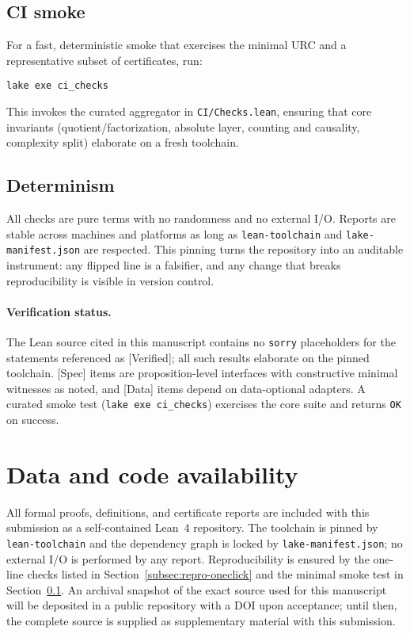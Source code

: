 \documentclass[11pt,a4paper,twoside]{article}
\numberwithin{equation}{section}
\theoremstyle{customthm}
\theoremstyle{customdef}
\theoremstyle{customrem}
\begin{document}
\subsection{CI smoke}\label{subsec:repro-ci}

For a fast, deterministic smoke that exercises the minimal URC and a representative subset of certificates, run:
\begin{lstlisting}
lake exe ci_checks
\end{lstlisting}
This invokes the curated aggregator in \texttt{CI/Checks.lean}, ensuring that core invariants (quotient/factorization, absolute layer, counting and causality, complexity split) elaborate on a fresh toolchain.

\subsection{Determinism}\label{subsec:repro-determinism}

All checks are pure terms with no randomness and no external I/O. Reports are stable across machines and platforms as long as \texttt{lean-toolchain} and \texttt{lake-manifest.json} are respected. This pinning turns the repository into an auditable instrument: any flipped line is a falsifier, and any change that breaks reproducibility is visible in version control.

\paragraph{Verification status.} The Lean source cited in this manuscript contains no \texttt{sorry} placeholders for the statements referenced as [Verified]; all such results elaborate on the pinned toolchain. [Spec] items are proposition-level interfaces with constructive minimal witnesses as noted, and [Data] items depend on data-optional adapters. A curated smoke test (\texttt{lake exe ci\_checks}) exercises the core suite and returns \texttt{OK} on success.

\section*{Data and code availability}\label{sec:data-availability}

All formal proofs, definitions, and certificate reports are included with this submission as a self-contained Lean~4 repository. The toolchain is pinned by \texttt{lean-toolchain} and the dependency graph is locked by \texttt{lake-manifest.json}; no external I/O is performed by any report. Reproducibility is ensured by the one-line checks listed in Section~\ref{subsec:repro-oneclick} and the minimal smoke test in Section~\ref{subsec:repro-ci}. An archival snapshot of the exact source used for this manuscript will be deposited in a public repository with a DOI upon acceptance; until then, the complete source is supplied as supplementary material with this submission.
\end{document}
